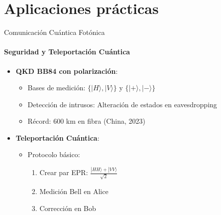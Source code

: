 \documentclass{beamer}
\begin{document}
\section{Aplicaciones prácticas}
\begin{frame}{Comunicación Cuántica Fotónica}
\framesubtitle{Seguridad y Teleportación Cuántica}

\begin{itemize}
    \item \textbf{QKD BB84 con polarización}:
    \begin{itemize}
        \item Bases de medición: $\{|H\rangle,|V\rangle\}$ y $\{|+\rangle,|-\rangle\}$
        \item Detección de intrusos: Alteración de estados en eavesdropping
        \item Récord: 600 km en fibra (China, 2023)
    \end{itemize}
    
    \item \textbf{Teleportación Cuántica}:
    \begin{itemize}
        \item Protocolo básico:
        \begin{enumerate}
            \item Crear par EPR: $\frac{|HH\rangle + |VV\rangle}{\sqrt{2}}$
            \item Medición Bell en Alice
            \item Corrección en Bob
        \end{enumerate}
    \end{itemize}
\end{itemize}
\end{frame}
\end{document}
